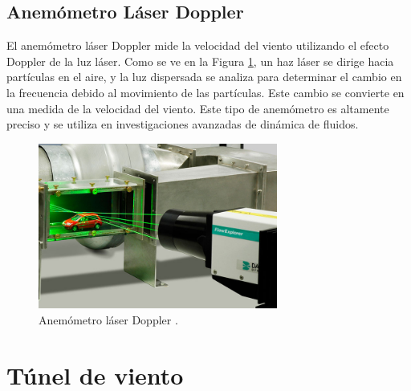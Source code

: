 \subsection*{Anemómetro Láser Doppler}

El anemómetro láser Doppler mide la velocidad del viento utilizando el efecto Doppler de la luz láser. Como se ve en la Figura \ref{fig:laserDoppler}, un haz láser se dirige hacia partículas en el aire, y la luz dispersada se analiza para determinar el cambio en la frecuencia debido al movimiento de las partículas. Este cambio se convierte en una medida de la velocidad del viento. Este tipo de anemómetro es altamente preciso y se utiliza en investigaciones avanzadas de dinámica de fluidos.

\begin{figure}[h]
    \centering
    \includegraphics[width=0.7\textwidth]{Figuras/viento/sensores/laserDoppler.png}
    \caption{Anemómetro láser Doppler \cite{dantecLDA2024}.}
    \label{fig:laserDoppler}
\end{figure}




\section{Túnel de viento}\label{tunelDeViento}

